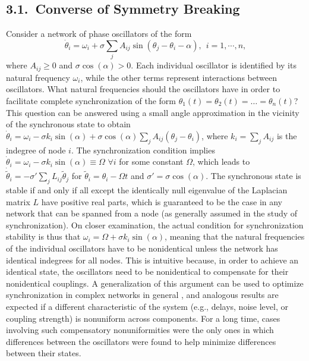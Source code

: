 \documentclass[
preprint,
superscriptaddress,
aps,
prl,
]{revtex4-1}
\begin{document}
\subsection{3.1.~Converse of Symmetry Breaking}
 
Consider a network of phase oscillators of the form 
\begin{equation}
\dot{\theta}_i=\omega_i +\sigma \sum_j A_{ij} \sin (\theta_j-\theta_i -\alpha),  ~~ i = 1, \cdots, n,
\label{eq6}  
\end{equation}
where $A_{ij}\ge 0$ and $\sigma \cos(\alpha)>0$.  
Each individual oscillator is identified by its natural frequency $\omega_i$, while the other terms represent  interactions between oscillators. What natural frequencies  should the oscillators have in order to facilitate complete synchronization of the form 
{\color{black} ${\theta}_1(t)={\theta}_2(t)=\dots ={\theta}_n(t)$?}
This question can
{\color{black} be}
 answered using a small angle approximation in the vicinity of the synchronous state to obtain 
$\dot{\theta}_i=\omega_i  -\sigma k_i \sin (\alpha) +\sigma \cos (\alpha) \sum_j A_{ij} (\theta_j-\theta_i )$, where $k_i=\sum_j A_{ij}$ is the indegree of node $i$.  The synchronization condition implies $\dot{\theta}_i=\omega_i  -\sigma k_i \sin (\alpha) \equiv \Omega $ $\forall i$ for some constant $\Omega$, which leads to $\dot{\tilde{\theta}}_i =  -\sigma'\sum_j L_{ij}\tilde{\theta}_j$ for $\tilde{\theta}_i = \theta_i -\Omega t$ and $\sigma' = \sigma \cos (\alpha)$.
The synchronous state is stable if and only if all except the identically null eigenvalue of the Laplacian matrix $L$ have positive real 
   {\color{black} parts,}
which is guaranteed to be the case in any network that can be spanned from a node (as  generally assumed in the study of synchronization). On closer examination, 
the actual
condition for synchronization stability is thus that  
 $\omega_i  = \Omega+\sigma k_i \sin (\alpha) $, 
meaning that the natural frequencies of the individual oscillators have to be nonidentical unless the network has identical indegrees for all nodes. This is
intuitive
because,
in order to achieve an identical state, the oscillators need to be nonidentical to compensate for their nonidentical couplings. 
A generalization of this argument can be used to optimize synchronization in complex networks in general \cite{skardal2014optimal}, and analogous results are expected
if a different characteristic of the system
 (e.g., delays, noise level, or coupling strength) is nonuniform across components.  
For a long time, cases involving such compensatory nonuniformities were the only ones
in which differences between the oscillators were found to help minimize differences between their states.
\end{document}
